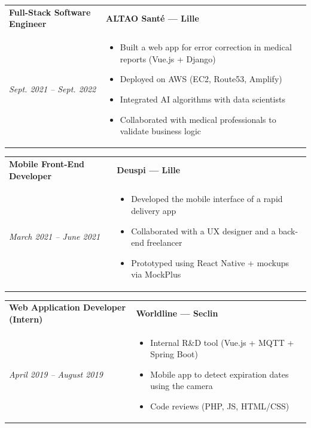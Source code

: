 \documentclass[a4paper,11pt]{article}
\begin{document}
\vspace{0.2cm}

\begin{tabularx}{\textwidth}{@{}l X@{}}
\textbf{Full-Stack Software Engineer} & \textbf{ALTAO Santé — Lille} \\
\textit{Sept. 2021 – Sept. 2022} & \begin{itemize}[nosep]
    \item Built a web app for error correction in medical reports (Vue.js + Django)
    \item Deployed on AWS (EC2, Route53, Amplify)
    \item Integrated AI algorithms with data scientists
    \item Collaborated with medical professionals to validate business logic
\end{itemize} \\
\end{tabularx}

\vspace{0.2cm}

\begin{tabularx}{\textwidth}{@{}l X@{}}
\textbf{Mobile Front-End Developer} & \textbf{Deuspi — Lille} \\
\textit{March 2021 – June 2021} & \begin{itemize}[nosep]
    \item Developed the mobile interface of a rapid delivery app
    \item Collaborated with a UX designer and a back-end freelancer
    \item Prototyped using React Native + mockups via MockPlus
\end{itemize} \\
\end{tabularx}

\vspace{0.2cm}

\begin{tabularx}{\textwidth}{@{}l X@{}}
\textbf{Web Application Developer (Intern)} & \textbf{Worldline — Seclin} \\
\textit{April 2019 – August 2019} & \begin{itemize}[nosep]
    \item Internal R\&D tool (Vue.js + MQTT + Spring Boot)
    \item Mobile app to detect expiration dates using the camera
    \item Code reviews (PHP, JS, HTML/CSS)
\end{itemize} \\
\end{tabularx}
\end{document}
